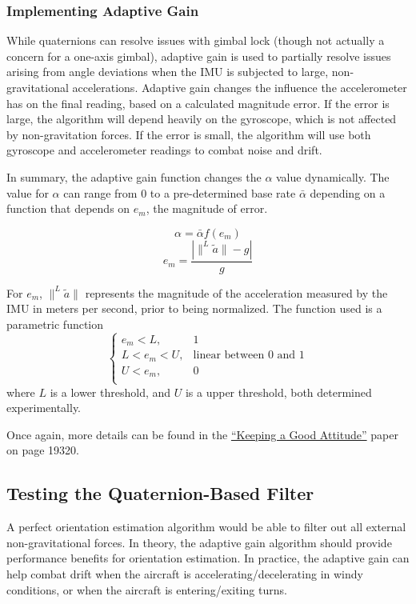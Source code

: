 \documentclass[11pt]{article} %
\begin{document}
\subsubsection{Implementing Adaptive Gain}
While quaternions can resolve issues with gimbal lock (though not actually a concern for a one-axis gimbal), adaptive gain is used to partially resolve issues arising from angle deviations when the IMU is subjected to large, non-gravitational accelerations. Adaptive gain changes the influence the accelerometer has on the final reading, based on a calculated magnitude error. If the error is large, the algorithm will depend heavily on the gyroscope, which is not affected by non-gravitation forces. If the error is small, the algorithm will use both gyroscope and accelerometer readings to combat noise and drift. 

In summary, the adaptive gain function changes the $\alpha$ value dynamically. The value for $\alpha$ can range from 0 to a pre-determined base rate $\bar{\alpha}$ depending on a function that depends on $e_m$, the magnitude of error. 

\[\alpha = \bar{\alpha}f(e_m)\]
\[e_m = \frac{|\|^L\tilde{a}\|-g|}{g}\]

For $e_m$, $\| ^L\tilde{a}\|$ represents the magnitude of the acceleration measured by the IMU in meters per second, prior to being normalized. The function used is a parametric function
\[\begin{cases}
	e_m < L, & 1 \\
	L < e_m < U, & \text{linear between 0 and 1} \\
	U < e_m, & 0 \\
\end{cases}\]
where $L$ is a lower threshold, and $U$ is a upper threshold, both determined experimentally. 

Once again, more details can be found in the \href{http://www.mdpi.com/1424-8220/15/8/19302}{``Keeping a Good Attitude''} paper on page 19320.


\subsection{Testing the Quaternion-Based Filter}

A perfect orientation estimation algorithm would be able to filter out all external non-gravitational forces. In theory, the adaptive gain algorithm should provide performance benefits for orientation estimation. In practice, the adaptive gain can help combat drift when the aircraft is accelerating/decelerating in windy conditions, or when the aircraft is entering/exiting turns. 
\end{document}
